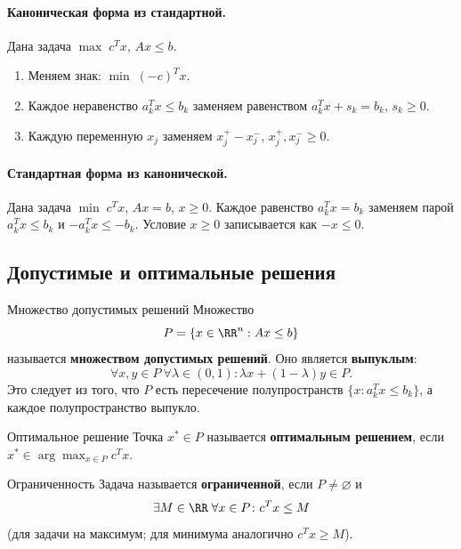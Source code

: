 \paragraph{Каноническая форма из стандартной.}
Дана задача $\max\; c^T x$, $Ax \le b$.
\begin{enumerate}
	\item Меняем знак: $\min\; (-c)^T x$.
	\item Каждое неравенство $a_k^T x \le b_k$ заменяем равенством $a_k^T x + s_k = b_k$, $s_k \ge 0$.
	\item Каждую переменную $x_j$ заменяем $x_j^+ - x_j^-$, $x_j^+, x_j^- \ge 0$.
\end{enumerate}

\paragraph{Стандартная форма из канонической.}
Дана задача $\min\; c^T x$, $Ax = b$, $x \ge 0$.
Каждое равенство $a_k^T x = b_k$ заменяем парой $a_k^T x \le b_k$ и $-a_k^T x \le -b_k$.
Условие $x \ge 0$ записывается как $-x \le 0$.

\subsection{Допустимые и оптимальные решения}

\begin{Definition}{Множество допустимых решений}{}
	Множество
	\[
	P = \{x \in \RR^n : Ax \le b\}
	\]
	называется \textbf{множеством допустимых решений}. Оно является \textbf{выпуклым}:
	\[
	\forall x, y \in P \ \forall \lambda \in (0,1)\colon \lambda x + (1-\lambda)y \in P.
	\]
	Это следует из того, что $P$ есть пересечение полупространств $\{x : a_k^T x \le b_k\}$, а каждое полупространство выпукло.
\end{Definition}

\begin{Definition}{Оптимальное решение}{}
	Точка $x^* \in P$ называется \textbf{оптимальным решением}, если $x^* \in \arg\max_{x \in P} c^T x$.
\end{Definition}

\begin{Definition}{Ограниченность}{}
	Задача называется \textbf{ограниченной}, если $P \ne \varnothing$ и
	\[
	\exists M \in \RR \; \forall x \in P\colon c^T x \le M
	\]
	(для задачи на максимум; для минимума аналогично $c^T x \ge M$).
\end{Definition}

